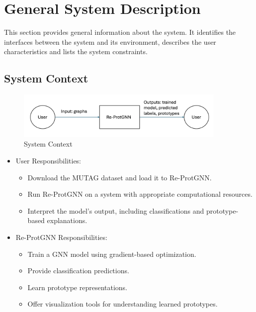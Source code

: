\documentclass[12pt]{article}
\begin{document}
\section{General System Description}

This section provides general information about the system.  It identifies the
interfaces between the system and its environment, describes the user
characteristics and lists the system constraints.

\subsection{System Context}


\begin{figure}[h!]
\begin{center}
 \includegraphics[width=0.9\textwidth]{SystemContextFigure}
\caption{System Context}
\label{Fig_SystemContext} 
\end{center}
\end{figure}

\begin{itemize}
\item User Responsibilities:
\begin{itemize}
\item Download the MUTAG dataset and load it to Re-ProtGNN. 
\item Run Re-ProtGNN on a system with appropriate computational resources.
\item Interpret the model’s output, including classifications and prototype-based explanations.
\end{itemize}
\item Re-ProtGNN Responsibilities:
\begin{itemize}
\item Train a GNN model using gradient-based optimization.
\item Provide classification predictions.
\item Learn prototype representations.
\item Offer visualization tools for understanding learned prototypes.
\end{itemize}
\end{itemize}
\end{document}
